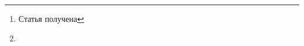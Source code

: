 \documentclass[journal]{styles/INJOITrus}
\theoremstyle{plain}
\theoremstyle{definition}
\begin{document}
\title{\Title}
\author{%
    \Authors
	\thanks{Статья получена \DateOfSubmission} %
    \AuthorsInfo
	\thanks{\Grant}
}

\maketitle
{} {}

\setcounter{page}{\FirstPageNumber}

\begin{abstract}
\Abstract
\end{abstract}

\begin{IEEEkeywords}
\Keywords
\end{IEEEkeywords}

\Source






\begin{otherlanguage}{english}
\title{\TitleEN}
\author{\AuthorsEN}
\maketitleeng
\begin{abstract}
\AbstractEN
\end{abstract}
\begin{IEEEkeywords}
\KeywordsEN
\end{IEEEkeywords}
\nocite{*}
\end{otherlanguage}
\end{document}
